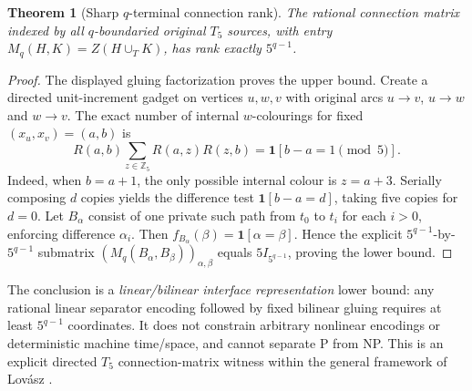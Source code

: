 \documentclass[11pt]{article}
\newtheorem{theorem}{Theorem}
\begin{document}
\begin{theorem}[Sharp $q$-terminal connection rank]
The rational connection matrix indexed by all $q$-boundaried
original $T_5$ sources, with entry
$M_q(H,K)=Z(H\cup_T K)$, has rank exactly $5^{q-1}$.
\end{theorem}
\begin{proof}
The displayed gluing factorization proves the upper bound.
Create a directed unit-increment gadget on vertices $u,w,v$
with original arcs $u\to v$, $u\to w$ and $w\to v$.
The exact number of internal $w$-colourings for fixed
$(x_u,x_v)=(a,b)$ is
\[
R(a,b)\sum_{z\in\mathbb Z_5}R(a,z)R(z,b)
=\mathbf1[b-a=1\pmod5].
\]
Indeed, when $b=a+1$, the only possible internal colour
is $z=a+3$. Serially composing $d$ copies yields the
difference test $\mathbf1[b-a=d]$, taking five copies for
$d=0$. Let $B_\alpha$ consist of one private such path from
$t_0$ to $t_i$ for each $i>0$, enforcing difference $\alpha_i$.
Then $f_{B_\alpha}(\beta)=\mathbf1[\alpha=\beta]$.
Hence the explicit $5^{q-1}$-by-$5^{q-1}$ submatrix
$(M_q(B_\alpha,B_\beta))_{\alpha,\beta}$ equals
$5I_{5^{q-1}}$, proving the lower bound.
\end{proof}
The conclusion is a \emph{linear/bilinear interface representation}
lower bound: any rational linear separator encoding followed by
fixed bilinear gluing requires at least $5^{q-1}$ coordinates.
It does not constrain arbitrary nonlinear encodings or
deterministic machine time/space, and cannot separate P from NP.
This is an explicit directed $T_5$ connection-matrix witness
within the general framework of Lov\'asz
\cite{LovaszConn2006}.
\end{document}
